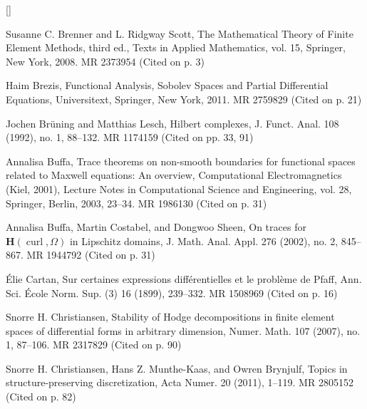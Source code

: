 \begin{list}{[]}{\setlength{\leftmargin}{2.7em}\setlength{\labelwidth}{2.2em}}
\item\label{bib:source-22}Susanne C. Brenner and L. Ridgway Scott, The Mathematical Theory of Finite Element Methods, third ed., Texts in Applied Mathematics, vol. 15, Springer, New York, 2008. MR 2373954 (Cited on p. 3)

\item\label{bib:source-23}Haim Brezis, Functional Analysis, Sobolev Spaces and Partial Differential Equations, Universitext, Springer, New York, 2011. MR 2759829 (Cited on p. 21)

\item\label{bib:source-24}Jochen Brüning and Matthias Lesch, Hilbert complexes, J. Funct. Anal. 108 (1992), no. 1, 88–132. MR 1174159 (Cited on pp. 33, 91)

\item\label{bib:source-25}Annalisa Buffa, Trace theorems on non-smooth boundaries for functional spaces related to Maxwell equations: An overview, Computational Electromagnetics (Kiel, 2001), Lecture Notes in Computational Science and Engineering, vol. 28, Springer, Berlin, 2003, 23–34. MR 1986130 (Cited on p. 31)

\item\label{bib:source-26}Annalisa Buffa, Martin Costabel, and Dongwoo Sheen, On traces for $\mathbf H(\operatorname{curl},\Omega)$ in Lipschitz domains, J. Math. Anal. Appl. 276 (2002), no. 2, 845–867. MR 1944792 (Cited on p. 31)

\item\label{bib:source-27}\label{bib:cartan-differential-expressions}Élie Cartan, Sur certaines expressions différentielles et le problème de Pfaff, Ann. Sci. École Norm. Sup. (3) 16 (1899), 239–332. MR 1508969 (Cited on p. 16)

\item\label{bib:source-28}Snorre H. Christiansen, Stability of Hodge decompositions in finite element spaces of differential forms in arbitrary dimension, Numer. Math. 107 (2007), no. 1, 87–106. MR 2317829 (Cited on p. 90)

\item\label{bib:source-29}Snorre H. Christiansen, Hans Z. Munthe-Kaas, and Owren Brynjulf, Topics in structure-preserving discretization, Acta Numer. 20 (2011), 1–119. MR 2805152 (Cited on p. 82)


\end{list}
